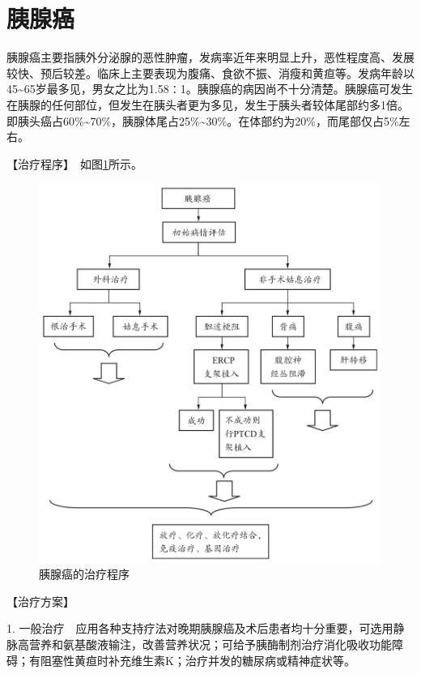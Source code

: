 \section{胰腺癌}

胰腺癌主要指胰外分泌腺的恶性肿瘤，发病率近年来明显上升，恶性程度高、发展较快、预后较差。临床上主要表现为腹痛、食欲不振、消瘦和黄疸等。发病年龄以45\textasciitilde{}65岁最多见，男女之比为1.58∶1。胰腺癌的病因尚不十分清楚。胰腺癌可发生在胰腺的任何部位，但发生在胰头者更为多见，发生于胰头者较体尾部约多1倍。即胰头癌占60\%\textasciitilde{}70\%，胰腺体尾占25\%\textasciitilde{}30\%。在体部约为20\%，而尾部仅占5\%左右。

【治疗程序】　如图\ref{fig3-19-1}所示。

\begin{figure}[!htbp]
 \centering
 \includegraphics{./images/Image00110.jpg}
 \captionsetup{justification=centering}
 \caption{胰腺癌的治疗程序}
 \label{fig3-19-1}
  \end{figure} 

【治疗方案】

1.
一般治疗　应用各种支持疗法对晚期胰腺癌及术后患者均十分重要，可选用静脉高营养和氨基酸液输注，改善营养状况；可给予胰酶制剂治疗消化吸收功能障碍；有阻塞性黄疸时补充维生素K；治疗并发的糖尿病或精神症状等。


